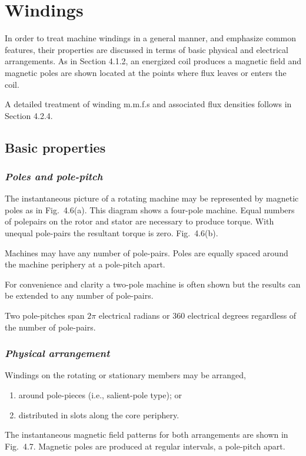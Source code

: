 \documentclass[a4paper,numbers=noenddot,12pt]{scrbook}
\begin{document}
            \section{Windings}
            In order to treat machine windings in a general manner, and emphasize common features, their properties are discussed in terms of basic physical and electrical arrangements. As in Section 4.1.2, an energized coil produces a magnetic field and magnetic poles are shown located at the points where flux leaves or enters the coil.

            A detailed treatment of winding m.m.f.s and associated flux densities follows in Section 4.2.4. 

            \subsection{Basic properties}

            \subsubsection{\textit{Poles and pole-pitch}}
            The instantaneous picture of a rotating machine may be represented by magnetic poles as in Fig.\ 4.6(a). This diagram shows a four-pole machine. Equal numbers of pole­pairs on the rotor and stator are necessary to produce torque. With unequal pole-pairs the resultant torque is zero. Fig.\ 4.6(b).

            Machines may have any number of pole-pairs. Poles are equally spaced around the machine periphery at a pole-pitch apart.

            For convenience and clarity a two-pole machine is often shown but the results can be extended to any number of pole-pairs.

            Two pole-pitches span $2\pi$ electrical radians or 360 electrical degrees regardless of the number of pole-pairs.

            \subsubsection{\textit{Physical arrangement}}
            Windings on the rotating or stationary members may be arranged,
            \begin{enumerate}
                \item around pole-pieces (i.e., salient-pole type); or 
                \item distributed in slots along the core periphery. 
            \end{enumerate}
            The instantaneous magnetic field patterns for both arrangements are shown in Fig.\ 4.7. Magnetic poles are produced at regular intervals, a pole-pitch apart.
\end{document}
